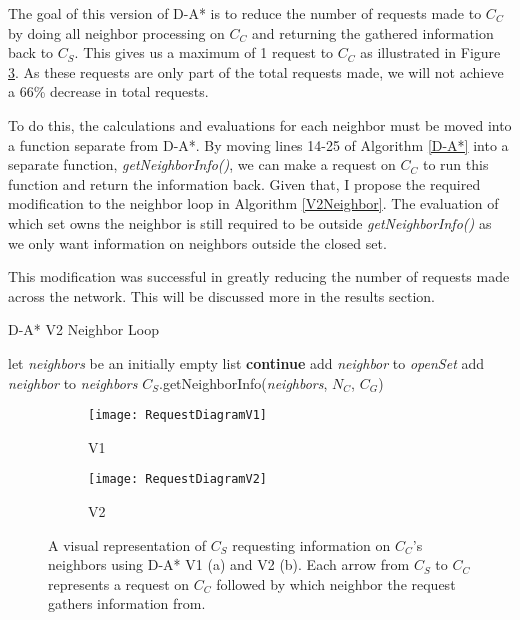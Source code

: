 The goal of this version of D-A* is to reduce the number of requests made to $C_C$ by doing all neighbor processing on $C_C$ and returning the gathered information back to $C_S$. This gives us a maximum of 1 request to $C_C$ as illustrated in Figure \ref{fig:ReqDiagrams}. As these requests are only part of the total requests made, we will not achieve a 66\% decrease in total requests.

To do this, the calculations and evaluations for each neighbor must be moved into a function separate from D-A*. By moving lines 14-25 of Algorithm \ref{D-A*} into a separate function, \textit{getNeighborInfo()}, we can make a request on $C_C$ to run this function and return the information back. Given that, I propose the required modification to the neighbor loop in Algorithm \ref{V2Neighbor}. The evaluation of which set owns the neighbor is still required to be outside \textit{getNeighborInfo()} as we only want information on neighbors outside the closed set.

This modification was successful in greatly reducing the number of requests made across the network. This will be discussed more in the results section. 

\begin{algorithm}
\caption{D-A* V2 Neighbor Loop}
\label{V2Neighbor}
\begin{algorithmic}[1]
\STATE let \textit{neighbors} be an initially empty list
		\STATE \textbf{continue}
	\ENDIF
		\STATE add \textit{neighbor} to \textit{openSet}
	\ENDIF
	\STATE add \textit{neighbor} to \textit{neighbors}
\ENDFOR		 
\STATE $C_S$.getNeighborInfo(\textit{neighbors}, $N_C$, $C_G$)
\end{algorithmic}
\end{algorithm}

\begin{figure}[h]
\centering
\begin{subfigure}{.49\textwidth}
\centering
	\texttt{[image: RequestDiagramV1]}
	\caption{V1}
	\label{fig:v1Req}
\end{subfigure}
\begin{subfigure}{.49\textwidth}
	\centering
	\texttt{[image: RequestDiagramV2]}
	\caption{V2}
	\label{fig:v2Req}
\end{subfigure}
\caption{A visual representation of $C_S$ requesting information on $C_C$'s neighbors using D-A* V1 (a) and V2 (b). Each arrow from $C_S$ to $C_C$ represents a request on $C_C$ followed by which neighbor the request gathers information from.}
\label{fig:ReqDiagrams}
\end{figure}
